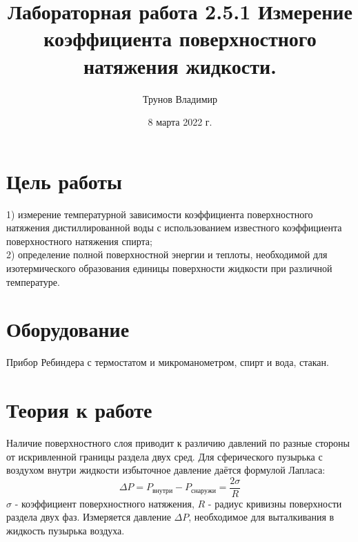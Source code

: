 \documentclass[a4paper, 12pt]{article}
\title{Лабораторная работа 2.5.1 Измерение коэффициента поверхностного натяжения жидкости.
       \vspace*{19 cm}}
\author{Трунов Владимир}
\date{8 марта 2022 г.
      \newpage}
\begin{document}
    \newpage
	\maketitle
	\section*{Цель работы}
		1) измерение температурной зависимости  коэффициента поверхностного натяжения дистиллированной воды с использованием известного коэффициента поверхностного натяжения спирта;  \\
        2) определение полной поверхностной энергии  и теплоты, необходимой для изотермического образования единицы  поверхности жидкости  при различной температуре.
	\section*{Оборудование}
		Прибор Ребиндера с термостатом и микроманометром, спирт и вода, стакан.
	\section*{Теория к работе}
		Наличие поверхностного слоя приводит к различию давлений по разные стороны от искривленной границы раздела двух сред.  Для сферического пузырька с воздухом  внутри жидкости избыточное давление даётся формулой Лапласа: 
		$$\Delta P = P_{внутри} - P_{снаружи} = \frac{2 \sigma}{R}$$
		$\sigma$ - коэффициент поверхностного натяжения, $R$ - радиус кривизны поверхности раздела двух фаз. Измеряется давление $\Delta P$, необходимое для выталкивания в жидкость пузырька воздуха. 
\end{document}
